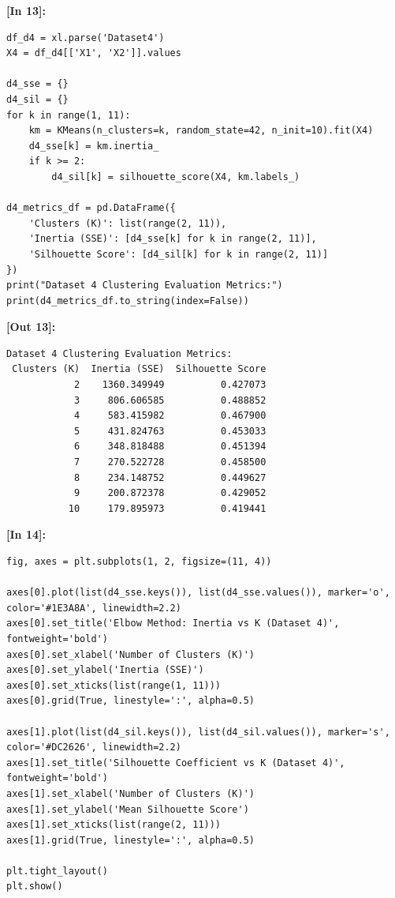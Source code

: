 \vspace{0.4em}
\noindent\textbf{\small [In 13]:}
\begin{lstlisting}[style=pycode]
df_d4 = xl.parse('Dataset4')
X4 = df_d4[['X1', 'X2']].values

d4_sse = {}
d4_sil = {}
for k in range(1, 11):
    km = KMeans(n_clusters=k, random_state=42, n_init=10).fit(X4)
    d4_sse[k] = km.inertia_
    if k >= 2:
        d4_sil[k] = silhouette_score(X4, km.labels_)

d4_metrics_df = pd.DataFrame({
    'Clusters (K)': list(range(2, 11)),
    'Inertia (SSE)': [d4_sse[k] for k in range(2, 11)],
    'Silhouette Score': [d4_sil[k] for k in range(2, 11)]
})
print("Dataset 4 Clustering Evaluation Metrics:")
print(d4_metrics_df.to_string(index=False))
\end{lstlisting}
\noindent\textbf{\small [Out 13]:}
\begin{lstlisting}[style=output]
Dataset 4 Clustering Evaluation Metrics:
 Clusters (K)  Inertia (SSE)  Silhouette Score
            2    1360.349949          0.427073
            3     806.606585          0.488852
            4     583.415982          0.467900
            5     431.824763          0.453033
            6     348.818488          0.451394
            7     270.522728          0.458500
            8     234.148752          0.449627
            9     200.872378          0.429052
           10     179.895973          0.419441
\end{lstlisting}

\vspace{0.4em}
\noindent\textbf{\small [In 14]:}
\begin{lstlisting}[style=pycode]
fig, axes = plt.subplots(1, 2, figsize=(11, 4))

axes[0].plot(list(d4_sse.keys()), list(d4_sse.values()), marker='o', color='#1E3A8A', linewidth=2.2)
axes[0].set_title('Elbow Method: Inertia vs K (Dataset 4)', fontweight='bold')
axes[0].set_xlabel('Number of Clusters (K)')
axes[0].set_ylabel('Inertia (SSE)')
axes[0].set_xticks(list(range(1, 11)))
axes[0].grid(True, linestyle=':', alpha=0.5)

axes[1].plot(list(d4_sil.keys()), list(d4_sil.values()), marker='s', color='#DC2626', linewidth=2.2)
axes[1].set_title('Silhouette Coefficient vs K (Dataset 4)', fontweight='bold')
axes[1].set_xlabel('Number of Clusters (K)')
axes[1].set_ylabel('Mean Silhouette Score')
axes[1].set_xticks(list(range(2, 11)))
axes[1].grid(True, linestyle=':', alpha=0.5)

plt.tight_layout()
plt.show()
\end{lstlisting}

